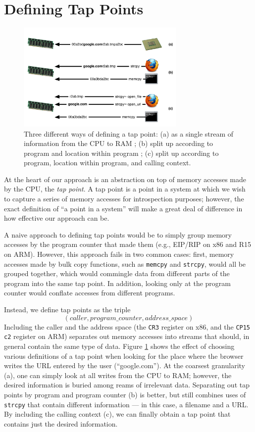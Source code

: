 \section{Defining Tap Points}
\label{sec:tapdef}

\begin{figure}[t]
\begin{center}
\includegraphics[width=3.2in]{tappoint.pdf}
\end{center}
\caption{Three different ways of defining a tap point: (a) as a single
stream of information from the CPU to RAM ; (b) split up according to
program and location within program ; (c) split up according to program,
location within program, and calling context.}
\label{fig:tappoint}
\end{figure}

At the heart of our approach is an abstraction on top of memory accesses
made by the CPU, the \emph{tap point}. A tap point is a point in a
system at which we wish to capture a series of memory accesses for
introspection purposes; however, the exact definition of ``a point in a
system'' will make a great deal of difference in how effective our
approach can be.

A naive approach to defining tap points would be to simply group memory
accesses by the program counter that made them (e.g., EIP/RIP on x86 and
R15 on ARM). However, this approach fails in two common cases: first,
memory accesses made by bulk copy functions, such as \texttt{memcpy} and
\texttt{strcpy}, would all be grouped together, which would commingle
data from different parts of the program into the same tap point. In
addition, looking only at the program counter would conflate accesses
from different programs.

Instead, we define tap points as the triple
\[ (caller, program\_counter, address\_space) \]
Including the caller and the address space (the \texttt{CR3} register on
x86, and the \texttt{CP15 c2} register on ARM) separates out memory
accesses into streams that should, in general contain the same type of
data. Figure \ref{fig:tappoint} shows the effect of choosing various
definitions of a tap point when looking for the place where the browser
writes the URL entered by the user (``google.com''). At the coarsest
granularity (a), one can simply look at all writes from the CPU to RAM;
however, the desired information is buried among reams of irrelevant
data.  Separating out tap points by program and program counter (b) is
better, but still combines uses of \texttt{strcpy} that contain
different information --- in this case, a filename and a URL. By
including the calling context (c), we can finally obtain a tap point
that contains just the desired information.

